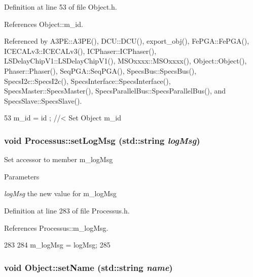 Definition at line 53 of file Object.h.

References Object::m\_\-id.

Referenced by A3PE::A3PE(), DCU::DCU(), export\_\-obj(), FePGA::FePGA(), ICECALv3::ICECALv3(), ICPhaser::ICPhaser(), LSDelayChipV1::LSDelayChipV1(), MSOxxxx::MSOxxxx(), Object::Object(), Phaser::Phaser(), SeqPGA::SeqPGA(), SpecsBus::SpecsBus(), SpecsI2c::SpecsI2c(), SpecsInterface::SpecsInterface(), SpecsMaster::SpecsMaster(), SpecsParallelBus::SpecsParallelBus(), and SpecsSlave::SpecsSlave().


\begin{DoxyCode}
53 { m_id    = id    ; } //< Set Object m_id
\end{DoxyCode}
\hypertarget{classProcessus_a471833f89047aa9a7ff6200a31c17a1d}{
\subsubsection[{setLogMsg}]{\setlength{\rightskip}{0pt plus 5cm}void Processus::setLogMsg (std::string {\em logMsg})}}
\label{classProcessus_a471833f89047aa9a7ff6200a31c17a1d}
Set accessor to member m\_\-logMsg 
\begin{DoxyParams}{Parameters}
\item[{\em logMsg}]the new value for m\_\-logMsg \end{DoxyParams}


Definition at line 283 of file Processus.h.

References Processus::m\_\-logMsg.


\begin{DoxyCode}
283                                     {
284     m_logMsg = logMsg;
285   }
\end{DoxyCode}
\hypertarget{classObject_ae30fea75683c2d149b6b6d17c09ecd0c}{
\subsubsection[{setName}]{\setlength{\rightskip}{0pt plus 5cm}void Object::setName (std::string {\em name})}}
\label{classObject_ae30fea75683c2d149b6b6d17c09ecd0c}


